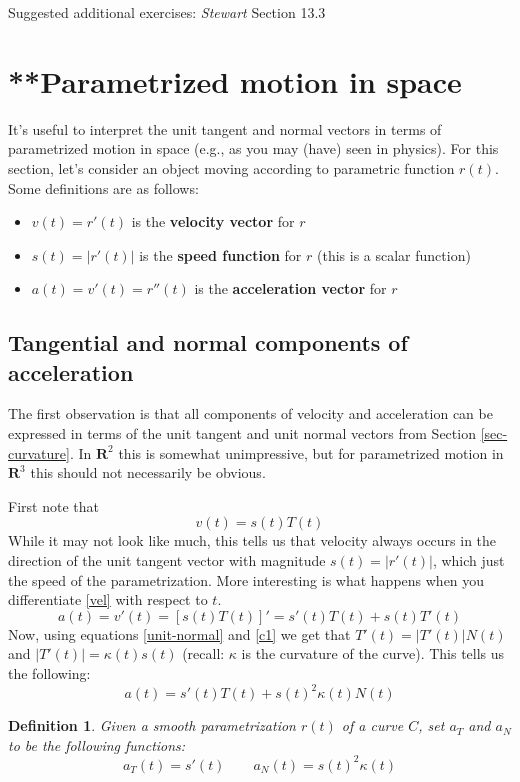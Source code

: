 \documentclass[12pt]{article}
\numberwithin{equation}{subsection}
\numberwithin{figure}{subsection}
\newtheorem{defn}[subsection]{Definition}
\theoremstyle{note}
\begin{document}
{Suggested additional exercises: \textit{Stewart} Section 13.3 


\section{**Parametrized motion in space}
It's useful to interpret the unit tangent and normal vectors in terms of parametrized motion in space (e.g., as you may (have) seen in physics). For this section, let's consider an object moving according to parametric function $r(t)$. Some definitions are as follows:
\begin{itemize} 
	\item  $v(t)=r'(t)$ is the  \textbf{velocity vector} for $r$ 
	\item $s(t)=|r'(t)|$ is the \textbf{speed function} for $r$ (this is a scalar function)
	\item  $a(t)=v'(t)=r''(t)$ is the \textbf{acceleration vector} for $r$
\end{itemize}


\subsection{Tangential and normal components of acceleration} The first observation is that all components of velocity and acceleration can be expressed in terms of the  unit tangent and unit normal vectors from Section \ref{sec-curvature}. In $\mathbf{R}^2$ this is somewhat unimpressive, but for parametrized motion in $\mathbf{R}^3$ this should not necessarily be obvious.

First note that
\begin{equation} v(t)= s(t) T(t) \label{vel} \end{equation}
While it may not look like much, this tells us that velocity always occurs in the direction of the unit tangent vector with magnitude $s(t)=|r'(t)|$, which just the speed of the parametrization. More interesting is what happens when you differentiate \eqref{vel} with respect to $t$. 
\[a(t)=v'(t)=\left\lbrack s(t)T(t) \right\rbrack' = s'(t) T(t) + s(t) T'(t)  
\]
Now, using equations \eqref{unit-normal} and \eqref{c1} we get that $T'(t)=|T'(t)| N(t)$ and $|T'(t)|=\kappa(t) s(t)$ (recall: $\kappa$ is the curvature of the curve). This tells us the following: 
\begin{equation} a(t) = s'(t) T(t) + s(t)^2 \kappa(t) N(t)\label{acc} \end{equation}
\begin{defn} \label{acc-tan-normal}	Given a smooth parametrization $r(t)$ of a curve $C$, set $a_T$ and $a_N$ to be the following functions: \begin{equation} a_T(t)=s'(t) \qquad a_N(t)=s(t)^2 \kappa(t)\end{equation}
\end{defn}

}
\end{document}
